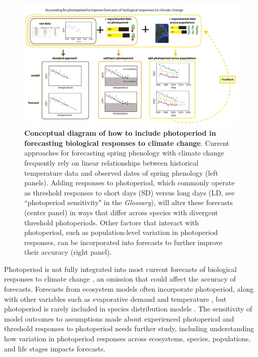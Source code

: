 \documentclass{article}
\begin{document}
 
 

\begin{figure}[p]
\includegraphics{..//..//analyses/photoperiod/figures/photocondiag6.pdf} 
\caption{\textbf{Conceptual diagram of how to include photoperiod in forecasting biological responses to climate change}. Current approaches for forecasting spring phenology with climate change frequently rely on linear relationships between historical temperature data and observed dates of spring phenology (left panels). Adding responses to photoperiod, which commonly operate as threshold responses to short days (SD) versus long days (LD, see ``photoperiod sensitivity" in the \emph{Glossary}), will alter these forecasts (center panel) in ways that differ across species with divergent threshold photoperiods. Other factors that interact with photoperiod, such as population-level variation in photoperiod responses, can be incorporated into forecasts to further improve their accuracy (right panel).}
 \label{fig:condiag}
 \end{figure}
 
\par Photoperiod is not fully integrated into most current forecasts of biological responses to climate change \citep[but see][]{tobin2008}, an omission that could affect the accuracy of forecasts. Forecasts from ecosystem models often incorporate photoperiod, along with other variables such as evaporative demand and temperature \citep [e.g., ED] []{jolly2005,medvigy2013}, but photoperiod is rarely included in species distribution models \citep [e.g.,] []{morin2009,zhu2012}. The sensitivity of model outcomes to assumptions made about experienced photoperiod and threshold responses to photoperiod needs further study, including understanding how variation in photoperiod responses across ecosystems, species, populations, and life stages impacts forecasts. 
\end{document}
